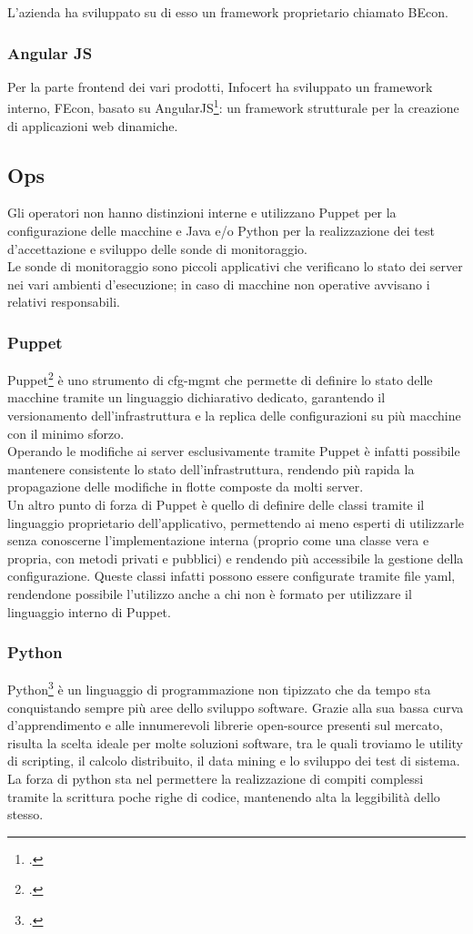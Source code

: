 L'azienda ha sviluppato su di esso un \gls{framework} proprietario chiamato BEcon.
\subsubsection{Angular JS}
Per la parte frontend dei vari prodotti, Infocert ha sviluppato un \gls{framework} interno, FEcon, basato su AngularJS\footcite{site:angular}: un \gls{framework} strutturale per la creazione di applicazioni web dinamiche.
\subsection{Ops}
Gli operatori non hanno distinzioni interne e utilizzano Puppet per la configurazione delle macchine e Java e/o Python per la realizzazione dei test d'accettazione e sviluppo delle sonde di monitoraggio. \\
Le sonde di monitoraggio sono piccoli applicativi che verificano lo stato dei server nei vari ambienti d'esecuzione; in caso di macchine non operative avvisano i relativi responsabili.
\subsubsection{Puppet}
Puppet\footcite{site:puppet} è uno strumento di \gls{cfg-mgmt} che permette di definire lo stato delle macchine tramite un linguaggio dichiarativo dedicato, garantendo il versionamento dell'infrastruttura e la replica delle configurazioni su più macchine con il minimo sforzo. \\
Operando le modifiche ai server esclusivamente tramite Puppet è infatti possibile mantenere consistente lo stato dell'infrastruttura, rendendo più rapida la propagazione delle modifiche in flotte composte da molti server. \\
Un altro punto di forza di Puppet è quello di definire delle classi tramite il linguaggio proprietario dell'applicativo, permettendo ai meno esperti di utilizzarle senza conoscerne l'implementazione interna (proprio come una classe vera e propria, con metodi privati e pubblici) e rendendo più accessibile la gestione della configurazione. Queste classi infatti possono essere configurate tramite file \gls{yaml}, rendendone possibile l'utilizzo anche a chi non è formato per utilizzare il linguaggio interno di Puppet.
\subsubsection{Python}
Python\footcite{site:python} è un linguaggio di programmazione non tipizzato che da tempo sta conquistando sempre più aree dello sviluppo software. Grazie alla sua bassa curva d'apprendimento e alle innumerevoli librerie open-source presenti sul mercato, risulta la scelta ideale per molte soluzioni software, tra le quali troviamo le utility di scripting, il calcolo distribuito, il data mining e lo sviluppo dei test di sistema. \\
La forza di python sta nel permettere la realizzazione di compiti complessi tramite la scrittura poche righe di codice, mantenendo alta la leggibilità dello stesso. \\